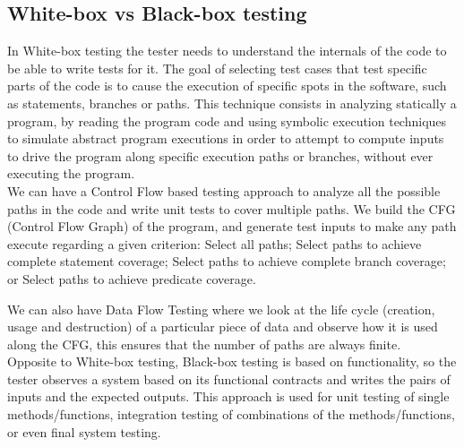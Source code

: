 \documentclass[10pt, conference, compsocconf]{IEEEtran}
\begin{document}
\subsection{White-box vs Black-box testing}
In White-box testing the tester needs to understand the internals of
the code to be able to write tests for it.
The goal of selecting test cases that test specific parts of the code
is to cause the execution of specific spots in the software, such as
statements, branches or
paths.
This technique consists in analyzing statically a program, by reading
the program code and using symbolic execution techniques to simulate
abstract program
executions in order to attempt to compute inputs to drive the program
along specific execution paths or branches, without ever executing the
program.\\
We can have a Control Flow based testing approach to analyze all the
possible paths in the code and write unit tests
to cover multiple paths.
We build the CFG (Control Flow Graph) of the program, and generate
test inputs to make any path execute
regarding a given criterion:
Select all paths;
 Select paths to achieve complete statement
 coverage\cite{stt,Ntafos:1988:CST:630792.631017};
 Select paths to achieve complete branch coverage\cite{Roper1994,stt};
 or Select paths to achieve predicate
 coverage\cite{stt,Ntafos:1988:CST:630792.631017}.

 We can also have Data Flow Testing where we look at the life cycle
 (creation, usage and destruction) of a particular
 piece of data and observe how it is used along the CFG, this ensures
 that the number of paths are always finite\cite{dataflow}.\\

 Opposite to White-box testing, Black-box testing is based on
 functionality, so the tester observes a system based
 on its functional contracts and writes the pairs of inputs and the
 expected outputs.
 This approach is used for unit testing of single methods/functions,
 integration testing
 of combinations of the methods/functions, or even final system testing.


\end{document}
